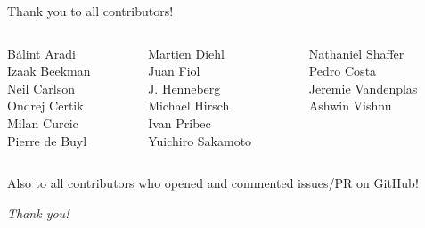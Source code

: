 \documentclass{beamer}
\begin{document}
\begin{frame}[c]{Thank you to all contributors!}
	\begin{columns}
	\begin{column}{0.33\textwidth}
		\begin{center}
		Bálint Aradi\\
		Izaak Beekman\\
		Neil Carlson\\
		Ondrej Certik\\
		Milan Curcic\\
		Pierre de Buyl\\
		\end{center}
	\end{column}
	\begin{column}{0.33\textwidth}
		\begin{center}
		Martien Diehl\\
		Juan Fiol\\
		J. Henneberg\\
		Michael Hirsch\\
		Ivan Pribec\\
		Yuichiro Sakamoto\\
		\end{center}
	\end{column}
	\begin{column}{0.33\textwidth}
		\begin{center}
		Nathaniel Shaffer\\
		Pedro Costa\\
		Jeremie Vandenplas\\
		Ashwin Vishnu\\
		\end{center}
	\end{column}
	\end{columns}
	\begin{center}
	\textcolor{mygreen}{Also to all contributors who opened and commented issues/PR on GitHub!}
	\end{center}
\end{frame}

\begin{frame}[c]{}
	\centering \Huge
	\emph{Thank you!}
\end{frame}
\end{document}
